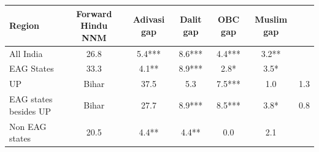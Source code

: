 \begin{tabular}{lccccc}
\hline
Region & Forward Hindu NNM & Adivasi gap & Dalit gap & OBC gap & Muslim gap \\
\hline
All India&26.8&5.4***&8.6***&4.4***&3.2**\\
EAG States&33.3&4.1**&8.9***&2.8*&3.5*\\
UP & Bihar&37.5&5.3&7.5***&1.0&1.3\\
EAG states besides UP & Bihar&27.7&8.9***&8.5***&3.8*&0.8\\
Non EAG states&20.5&4.4**&4.4**&0.0&2.1\\
\hline
\end{tabular}
